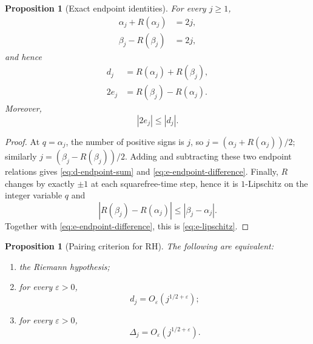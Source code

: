 \documentclass[11pt]{amsart}
\numberwithin{equation}{section}
\theoremstyle{plain}
\newtheorem{proposition}[theorem]{Proposition}
\theoremstyle{definition}
\theoremstyle{remark}
\begin{document}
\begin{proposition}[Exact endpoint identities]
\label{prop:pairing-endpoints}
For every $j\ge1$,
\begin{align}
\alpha_j+R(\alpha_j)&=2j,
\label{eq:alpha-endpoint}\\[2mm]
\beta_j-R(\beta_j)&=2j,
\label{eq:beta-endpoint}
\end{align}
and hence
\begin{align}
d_j&=R(\alpha_j)+R(\beta_j),
\label{eq:d-endpoint-sum}\\
2e_j&=R(\beta_j)-R(\alpha_j).
\label{eq:e-endpoint-difference}
\end{align}
Moreover,
\begin{equation}
\label{eq:e-lipschitz}
|2e_j|\le |d_j|.
\end{equation}
\end{proposition}

\begin{proof}
At $q=\alpha_j$, the number of positive signs is $j$, so
$j=(\alpha_j+R(\alpha_j))/2$; similarly
$j=(\beta_j-R(\beta_j))/2$.  Adding and subtracting these two endpoint
relations gives \eqref{eq:d-endpoint-sum} and
\eqref{eq:e-endpoint-difference}.  Finally, $R$ changes by exactly $\pm1$ at
each squarefree-time step, hence it is $1$-Lipschitz on the integer variable
$q$ and
\begin{equation}
\label{eq:R-lipschitz-pair}
|R(\beta_j)-R(\alpha_j)|\le |\beta_j-\alpha_j|.
\end{equation}
Together with \eqref{eq:e-endpoint-difference}, this is
\eqref{eq:e-lipschitz}.
\end{proof}

\begin{proposition}[Pairing criterion for RH]
\label{prop:pairing-rh}
The following are equivalent:
\begin{enumerate}[label=(\alph*)]
\item the Riemann hypothesis;
\item for every $\varepsilon>0$,
\begin{equation}
\label{eq:d-rh-criterion}
d_j=O_\varepsilon\!\left(j^{1/2+\varepsilon}\right);
\end{equation}
\item for every $\varepsilon>0$,
\begin{equation}
\label{eq:Delta-rh-criterion}
\Delta_j=O_\varepsilon\!\left(j^{1/2+\varepsilon}\right).
\end{equation}
\end{enumerate}
\end{proposition}
\end{document}

